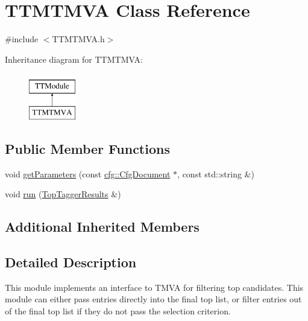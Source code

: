 \hypertarget{classTTMTMVA}{\section{T\-T\-M\-T\-M\-V\-A Class Reference}
\label{classTTMTMVA}
}


{\ttfamily \#include $<$T\-T\-M\-T\-M\-V\-A.\-h$>$}

Inheritance diagram for T\-T\-M\-T\-M\-V\-A\-:\begin{figure}[H]
\begin{center}
\leavevmode
\includegraphics[height=2.000000cm]{classTTMTMVA}
\end{center}
\end{figure}
\subsection*{Public Member Functions}
\begin{DoxyCompactItemize}
\item 
void \hyperlink{classTTMTMVA_a00b1eda9a6425e95eb4e0f41688236e0}{get\-Parameters} (const \hyperlink{classcfg_1_1CfgDocument}{cfg\-::\-Cfg\-Document} $\ast$, const std\-::string \&)
\item 
void \hyperlink{classTTMTMVA_a640584674f072cb893685845080c5eb9}{run} (\hyperlink{classTopTaggerResults}{Top\-Tagger\-Results} \&)
\end{DoxyCompactItemize}
\subsection*{Additional Inherited Members}


\subsection{Detailed Description}
This module implements an interface to T\-M\-V\-A for filtering top candidates. This module can either pass entries directly into the final top list, or filter entries out of the final top list if they do not pass the selection criterion.


